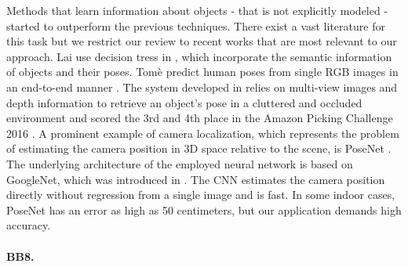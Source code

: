 Methods that learn information about objects - that is not explicitly modeled - started to outperform the previous techniques. There exist a vast literature for this task but we restrict our review to recent works that are most relevant to our approach.
\nnewline
Lai \etal use decision tress in \cite{klai}, which incorporate the semantic information of objects and their poses. Tom{\`{e}} \etal predict human poses from single RGB images in an end-to-end manner \cite{dtome}. The system developed in \cite{azeng} relies on multi-view images and depth information to retrieve an object's pose in a cluttered and occluded environment and scored the 3rd and 4th place in the Amazon Picking Challenge 2016 \cite{apc}. A prominent example of camera localization, which represents the problem of estimating the camera position in 3D space relative to the scene, is PoseNet \cite{posenet}. The underlying architecture of the employed neural network is based on GoogleNet, which was introduced in \cite{googlenet}. The CNN estimates the camera position directly without regression from a single image and is fast. In some indoor cases, PoseNet has an error as high as 50 centimeters, but our application demands high accuracy.

\paragraph{BB8.}

